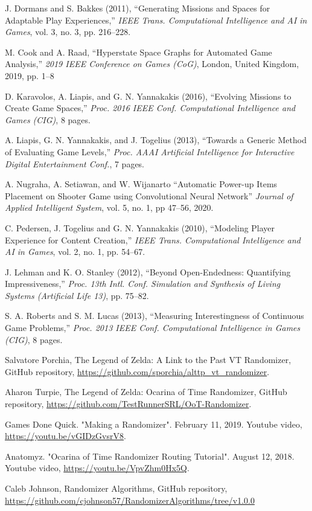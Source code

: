 \documentclass{ieeeaccess}
\begin{document}
\begin{thebibliography}{00}

 J. Dormans and S. Bakkes (2011), ``Generating Missions and Spaces for Adaptable
Play Experiences,'' \textit{IEEE Trans. Computational Intelligence and AI in Games}, vol. 3,
no. 3, pp. 216--228.

 M. Cook and A. Raad, ``Hyperstate Space Graphs for Automated Game Analysis,''
\textit{2019 IEEE Conference on Games (CoG)}, London, United Kingdom, 2019, pp. 1--8

 D. Karavolos, A. Liapis, and G. N. Yannakakis (2016), ``Evolving Missions to
Create Game Spaces,'' \textit{Proc. 2016 IEEE Conf. Computational Intelligence and Games
(CIG)}, 8 pages.

 A. Liapis, G. N. Yannakakis, and J. Togelius (2013), ``Towards a Generic Method of
Evaluating Game Levels,'' \textit{Proc. AAAI Artificial Intelligence for Interactive Digital
Entertainment Conf.}, 7 pages.

 A. Nugraha, A. Setiawan, and W. Wijanarto ``Automatic Power-up Items Placement on 
Shooter Game using Convolutional Neural Network'' \textit{Journal of Applied Intelligent System}, 
vol. 5, no. 1, pp 47--56, 2020. 

 C. Pedersen, J. Togelius and G. N. Yannakakis (2010), ``Modeling Player Experience
for Content Creation,'' \textit{IEEE Trans. Computational Intelligence and AI in Games}, vol.
2, no. 1, pp. 54--67.

 J. Lehman and K. O. Stanley (2012), ``Beyond Open-Endedness: Quantifying
Impressiveness,'' \textit{Proc. 13th Intl. Conf. Simulation and Synthesis of Living Systems
(Artificial Life 13)}, pp. 75--82.

 S. A. Roberts and S. M. Lucas (2013), ``Measuring Interestingness of Continuous
Game Problems,'' \textit{Proc. 2013 IEEE Conf. Computational Intelligence in Games (CIG)}, 8
pages.

 Salvatore Porchia, The Legend of Zelda: A Link to the Past VT Randomizer, GitHub
repository,
\href{https://github.com/sporchia/alttp\_vt\_randomizer}
{https://github.com/sporchia/alttp\_vt\_randomizer}.

 Aharon Turpie, The Legend of Zelda: Ocarina of Time Randomizer, GitHub repository,
\href{https://github.com/TestRunnerSRL/OoT-Randomizer}
{https://github.com/TestRunnerSRL/OoT-Randomizer}.

 Games Done Quick. "Making a Randomizer". February 11, 2019. Youtube video,
\href{https://youtu.be/vGIDzGvsrV8}
{https://youtu.be/vGIDzGvsrV8}.

 Anatomyz. "Ocarina of Time Randomizer Routing Tutorial".
August 12, 2018. Youtube video, 
\href{https://youtu.be/VpvZhm0Hx5Q}
{https://youtu.be/VpvZhm0Hx5Q}.

 Caleb Johnson, Randomizer Algorithms, GitHub repository,
\href{https://github.com/cjohnson57/RandomizerAlgorithms/tree/v1.0.0}
{https://github.com/cjohnson57/RandomizerAlgorithms/tree/v1.0.0}

\end{thebibliography}
\end{document}
